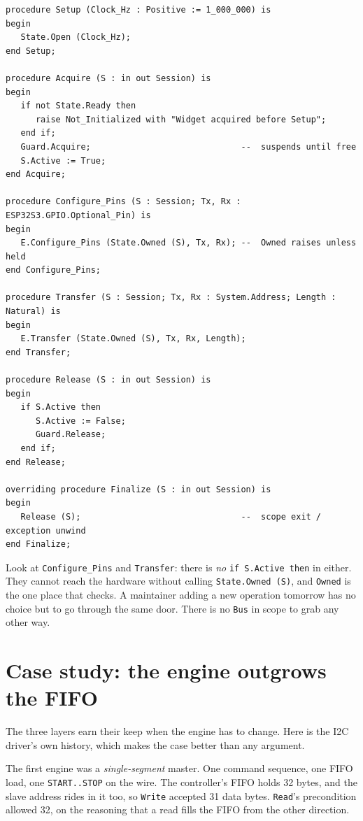 \begin{lstlisting}
procedure Setup (Clock_Hz : Positive := 1_000_000) is
begin
   State.Open (Clock_Hz);
end Setup;

procedure Acquire (S : in out Session) is
begin
   if not State.Ready then
      raise Not_Initialized with "Widget acquired before Setup";
   end if;
   Guard.Acquire;                              --  suspends until free
   S.Active := True;
end Acquire;

procedure Configure_Pins (S : Session; Tx, Rx : ESP32S3.GPIO.Optional_Pin) is
begin
   E.Configure_Pins (State.Owned (S), Tx, Rx); --  Owned raises unless held
end Configure_Pins;

procedure Transfer (S : Session; Tx, Rx : System.Address; Length : Natural) is
begin
   E.Transfer (State.Owned (S), Tx, Rx, Length);
end Transfer;

procedure Release (S : in out Session) is
begin
   if S.Active then
      S.Active := False;
      Guard.Release;
   end if;
end Release;

overriding procedure Finalize (S : in out Session) is
begin
   Release (S);                                --  scope exit / exception unwind
end Finalize;
\end{lstlisting}

Look at \texttt{Configure\_Pins} and \texttt{Transfer}: there is \emph{no}
\texttt{if S.Active then} in either. They cannot reach the hardware without
calling \texttt{State.Owned (S)}, and \texttt{Owned} is the one place that checks.
A maintainer adding a new operation tomorrow has no choice but to go through the
same door. There is no \texttt{Bus} in scope to grab any other way.

\section{Case study: the engine outgrows the FIFO}
\label{driver:end-opcode}

The three layers earn their keep when the engine has to change. Here is the
I2C driver's own history, which makes the case better than any argument.

The first engine was a \emph{single-segment} master. One command sequence, one
FIFO load, one \texttt{START..STOP} on the wire. The controller's FIFO holds 32
bytes, and the slave address rides in it too, so \texttt{Write} accepted 31 data
bytes. \texttt{Read}'s precondition allowed 32, on the reasoning that a read fills
the FIFO from the other direction.

